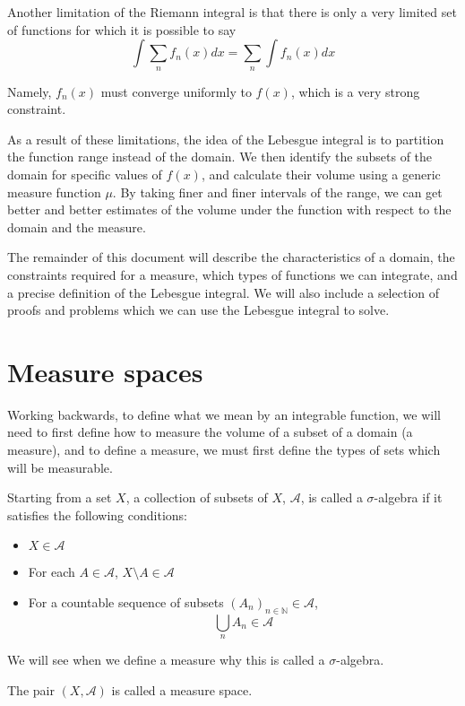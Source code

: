 \documentclass{article}
\begin{document}
Another limitation of the Riemann integral is that there is only a very limited set of
functions for which  it is possible to say 
\[\int \sum_n f_n(x) dx = \sum_n \int f_n(x) dx \]

Namely, $f_n(x)$ must converge uniformly to $f(x)$, which is a very strong constraint.

As a result of these limitations, the idea of the Lebesgue integral is to partition
the function range instead of the domain. We then identify the subsets of the domain for
specific values of $f(x)$, and calculate their volume using a generic measure function
$\mu$. By taking finer and finer intervals of the range, we can get better and better 
estimates of the volume under the function with respect to the domain and the measure.

The remainder of this document will describe the characteristics of a domain, the
constraints required for a measure, which types of functions we can integrate, and
a precise definition of the Lebesgue integral. We will also include a selection of
proofs and problems which we can use the Lebesgue integral to solve.

\section{Measure spaces}

Working backwards, to define what we mean by an integrable function, we will need to
first define how to measure the volume of a subset of a domain (a measure), and to
define a measure, we must first define the types of sets which will be measurable.

Starting from a set $X$, a collection of subsets of $X$, $\mathcal{A}$, is called a
$\sigma$-algebra if it satisfies the following conditions:

\begin{itemize}
		\item $X \in \mathcal{A}$
		\item For each $A \in \mathcal{A}$, $X \setminus A \in \mathcal{A}$
		\item For a countable sequence of subsets $(A_n)_{n \in \mathbb{N}} \in \mathcal{A}$,
			\[\bigcup_{n} A_n \in \mathcal{A} \]
\end{itemize}

We will see when we define a measure why this is called a $\sigma$-algebra.

The pair $(X, \mathcal{A})$ is called a measure space.
\end{document}
